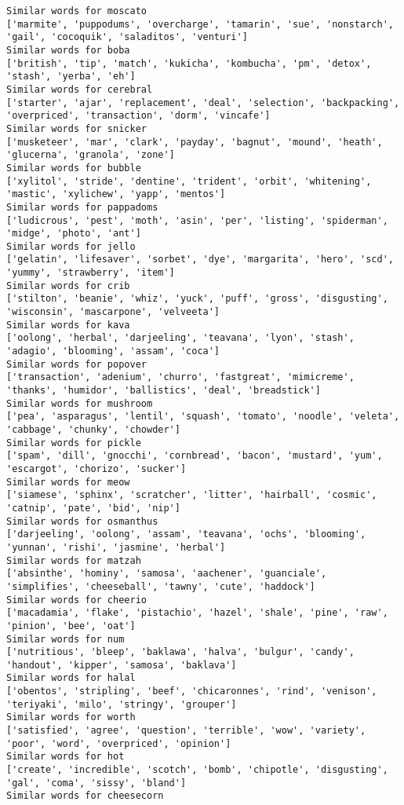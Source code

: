 \documentclass[11pt]{article}
\begin{document}
\begin{Verbatim}[commandchars=\\\{\}]
Similar words for moscato
['marmite', 'puppodums', 'overcharge', 'tamarin', 'sue', 'nonstarch', 'gail', 'cocoquik', 'saladitos', 'venturi']
Similar words for boba
['british', 'tip', 'match', 'kukicha', 'kombucha', 'pm', 'detox', 'stash', 'yerba', 'eh']
Similar words for cerebral
['starter', 'ajar', 'replacement', 'deal', 'selection', 'backpacking', 'overpriced', 'transaction', 'dorm', 'vincafe']
Similar words for snicker
['musketeer', 'mar', 'clark', 'payday', 'bagnut', 'mound', 'heath', 'glucerna', 'granola', 'zone']
Similar words for bubble
['xylitol', 'stride', 'dentine', 'trident', 'orbit', 'whitening', 'mastic', 'xylichew', 'yapp', 'mentos']
Similar words for pappadoms
['ludicrous', 'pest', 'moth', 'asin', 'per', 'listing', 'spiderman', 'midge', 'photo', 'ant']
Similar words for jello
['gelatin', 'lifesaver', 'sorbet', 'dye', 'margarita', 'hero', 'scd', 'yummy', 'strawberry', 'item']
Similar words for crib
['stilton', 'beanie', 'whiz', 'yuck', 'puff', 'gross', 'disgusting', 'wisconsin', 'mascarpone', 'velveeta']
Similar words for kava
['oolong', 'herbal', 'darjeeling', 'teavana', 'lyon', 'stash', 'adagio', 'blooming', 'assam', 'coca']
Similar words for popover
['transaction', 'adenium', 'churro', 'fastgreat', 'mimicreme', 'thanks', 'humidor', 'ballistics', 'deal', 'breadstick']
Similar words for mushroom
['pea', 'asparagus', 'lentil', 'squash', 'tomato', 'noodle', 'veleta', 'cabbage', 'chunky', 'chowder']
Similar words for pickle
['spam', 'dill', 'gnocchi', 'cornbread', 'bacon', 'mustard', 'yum', 'escargot', 'chorizo', 'sucker']
Similar words for meow
['siamese', 'sphinx', 'scratcher', 'litter', 'hairball', 'cosmic', 'catnip', 'pate', 'bid', 'nip']
Similar words for osmanthus
['darjeeling', 'oolong', 'assam', 'teavana', 'ochs', 'blooming', 'yunnan', 'rishi', 'jasmine', 'herbal']
Similar words for matzah
['absinthe', 'hominy', 'samosa', 'aachener', 'guanciale', 'simplifies', 'cheeseball', 'tawny', 'cute', 'haddock']
Similar words for cheerio
['macadamia', 'flake', 'pistachio', 'hazel', 'shale', 'pine', 'raw', 'pinion', 'bee', 'oat']
Similar words for num
['nutritious', 'bleep', 'baklawa', 'halva', 'bulgur', 'candy', 'handout', 'kipper', 'samosa', 'baklava']
Similar words for halal
['obentos', 'stripling', 'beef', 'chicaronnes', 'rind', 'venison', 'teriyaki', 'milo', 'stringy', 'grouper']
Similar words for worth
['satisfied', 'agree', 'question', 'terrible', 'wow', 'variety', 'poor', 'word', 'overpriced', 'opinion']
Similar words for hot
['create', 'incredible', 'scotch', 'bomb', 'chipotle', 'disgusting', 'gal', 'coma', 'sissy', 'bland']
Similar words for cheesecorn

\end{Verbatim}
\end{document}

